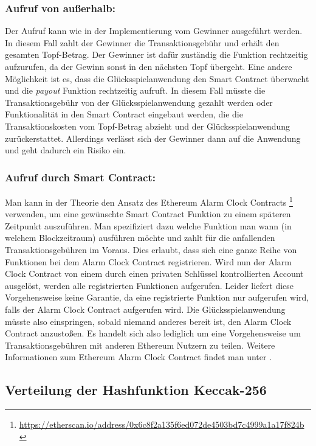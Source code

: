 \subsubsection{Aufruf von außerhalb:}
Der Aufruf kann wie in der Implementierung vom Gewinner ausgeführt werden. In diesem Fall zahlt der Gewinner die Transaktionsgebühr und erhält den gesamten Topf-Betrag. Der Gewinner ist dafür zuständig die Funktion rechtzeitig aufzurufen, da der Gewinn sonst in den nächsten Topf übergeht. Eine andere Möglichkeit ist es, dass die Glücksspielanwendung den Smart Contract überwacht und die \textit{payout} Funktion rechtzeitig aufruft. In diesem Fall müsste die Transaktionsgebühr von der Glücksspielanwendung gezahlt werden oder Funktionalität in den Smart Contract eingebaut werden, die die Transaktionskosten vom Topf-Betrag abzieht und der Glücksspielanwendung zurückerstattet. Allerdings verlässt sich der Gewinner dann auf die Anwendung und geht dadurch ein Risiko ein.

\subsubsection{Aufruf durch Smart Contract:}
Man kann in der Theorie den Ansatz des Ethereum Alarm Clock Contracts \footnote{\url{https://etherscan.io/address/0x6c8f2a135f6ed072de4503bd7c4999a1a17f824b}} verwenden, um eine gewünschte Smart Contract Funktion zu einem späteren Zeitpunkt auszuführen. Man spezifiziert dazu welche Funktion man wann (in welchem Blockzeitraum) ausführen möchte und zahlt für die anfallenden Transaktionsgebühren im Voraus. Dies erlaubt, dass sich eine ganze Reihe von Funktionen bei dem Alarm Clock Contract registrieren. Wird nun der Alarm Clock Contract von einem durch einen privaten Schlüssel kontrollierten Account ausgelöst, werden alle registrierten Funktionen aufgerufen. Leider liefert diese Vorgehensweise keine  Garantie, da eine registrierte Funktion nur aufgerufen wird, falls der Alarm Clock Contract aufgerufen wird. Die Glücksspielanwendung müsste also einspringen, sobald niemand anderes bereit ist, den Alarm Clock Contract anzustoßen. Es handelt sich also lediglich um eine Vorgehensweise um Transaktionsgebühren mit anderen Ethereum Nutzern zu teilen. Weitere Informationen zum Ethereum Alarm Clock Contract findet man unter \cite{eth_alarm_clock}.

\subsection{Verteilung der Hashfunktion Keccak-256}\label{eth_distribution}


